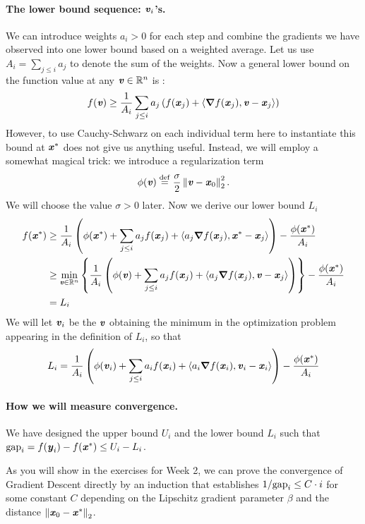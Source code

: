 \paragraph{The lower bound sequence: $\boldsymbol{\mathit{v}}_i$'s.}
We can introduce weights $a_i > 0$ for each step and combine the
gradients we have observed into one lower bound based on a weighted
average. Let us use $A_i = \sum_{j \leq i} a_j$ to denote the sum of
the weights. Now a general lower bound on the function value at any
$\boldsymbol{\mathit{v}} \in \mathbb{R}^n$ is
:
\[
 f(\boldsymbol{\mathit{v}})
 \geq
 \frac{1}{A_i}
 \sum_{j \leq i} a_j \left(  f(\boldsymbol{\mathit{x}}_j)
   + \left< \boldsymbol{\nabla}
     f(\boldsymbol{\mathit{x}}_j) , \boldsymbol{\mathit{v}} - \boldsymbol{\mathit{x}}_j \right>
   \right)
 \]
However, to use Cauchy-Schwarz on each individual term here to
instantiate this bound at $\boldsymbol{\mathit{x}}^*$ does not give us anything useful.
Instead, we will employ a somewhat magical trick: we introduce a
regularization term
\[
  \phi(\boldsymbol{\mathit{v}}) \stackrel{\mathrm{def}}{=} \frac{\sigma}{2} \left\|  \boldsymbol{\mathit{v}} -
    \boldsymbol{\mathit{x}}_0 \right\|_2^2
  .
\]
We will choose the value $\sigma > 0$ later.
Now  we derive our lower bound $L_i$
\begin{align*}
 f(\boldsymbol{\mathit{x}}^*)
 &\geq
   \frac{1}{A_i}
    \left(
\phi(\boldsymbol{\mathit{x}}^*)
 +
 \sum_{j \leq i} a_j  f(\boldsymbol{\mathit{x}}_j)
   + \left<  a_j\boldsymbol{\nabla}
     f(\boldsymbol{\mathit{x}}_j) , \boldsymbol{\mathit{x}}^* - \boldsymbol{\mathit{x}}_j \right>
\right)
 -
\frac{\phi(\boldsymbol{\mathit{x}}^*)}{A_i}
   \\
  &\geq
    \min_{\boldsymbol{\mathit{v}} \in \mathbb{R}^n} \left\{
   \frac{1}{A_i}
    \left(
\phi(\boldsymbol{\mathit{v}})
 +
 \sum_{j \leq i} a_j  f(\boldsymbol{\mathit{x}}_j)
   + \left<  a_j\boldsymbol{\nabla}
     f(\boldsymbol{\mathit{x}}_{j}) ,\boldsymbol{\mathit{v}} - \boldsymbol{\mathit{x}}_j \right>
 \right)
     \right\}
    -
    \frac{\phi(\boldsymbol{\mathit{x}}^*)}{A_i}
  \\
  &= L_i
\end{align*}
We will let $\boldsymbol{\mathit{v}}_i$ be the $\boldsymbol{\mathit{v}}$ obtaining the minimum in the
optimization problem appearing in the definition of $L_i$, so that
\[
  L_i
  =
  \frac{1}{A_i}
  \left(
    \phi(\boldsymbol{\mathit{v}}_i)
    +
    \sum_{j \leq i} a_i  f(\boldsymbol{\mathit{x}}_i)
    + \left<  a_i\boldsymbol{\nabla}
      f(\boldsymbol{\mathit{x}}_{i}) ,\boldsymbol{\mathit{v}}_i - \boldsymbol{\mathit{x}}_i \right>
  \right)
  -
  \frac{\phi(\boldsymbol{\mathit{x}}^*)}{A_i}
\]
\paragraph{How we will measure convergence.}
We have designed the upper bound $U_i$ and the lower bound $L_i$ such
that $\text{gap}_i = f(\boldsymbol{\mathit{y}}_i)-f(\boldsymbol{\mathit{x}}^*) \leq U_i - L_i$.

As you will show in the exercises for Week 2, we can prove the
convergence of Gradient Descent directly by an induction that
establishes $1/\text{gap}_i \leq C \cdot i $ for some constant $C$ depending
on the Lipschitz gradient parameter $\beta$ and the distance $\left\| \boldsymbol{\mathit{x}}_0
 - \boldsymbol{\mathit{x}}^* \right\|_2$.

